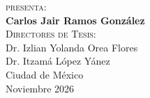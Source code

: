 \begin{titlepage}
\begin{minipage}[t]{0.75\textwidth}
        {\large\scshape presenta:}\\[0.5cm]
        {\large\bfseries Carlos Jair Ramos González}\\[1cm]

        {\large\scshape Directores de Tesis:}\\[0.3cm]
        {\large Dr. Izlian Yolanda Orea Flores}\\[0.2cm]
        {\large Dr. Itzamá López Yánez}\\[1cm]

        {\large Ciudad de México}\\[0.2cm]
        {\large Noviembre 2026}
    \end{minipage}

\end{titlepage}
